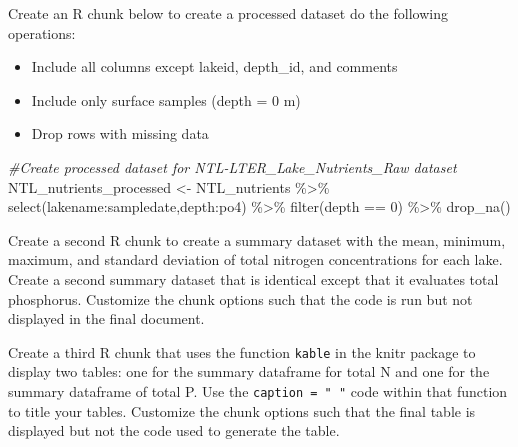 \documentclass[
]{article}
\newenvironment{Shaded}{\begin{snugshade}}{\end{snugshade}}
\newcommand{\CommentTok}[1]{\textcolor[rgb]{0.56,0.35,0.01}{\textit{#1}}}
\newcommand{\DecValTok}[1]{\textcolor[rgb]{0.00,0.00,0.81}{#1}}
\newcommand{\FunctionTok}[1]{\textcolor[rgb]{0.00,0.00,0.00}{#1}}
\newcommand{\NormalTok}[1]{#1}
\newcommand{\OtherTok}[1]{\textcolor[rgb]{0.56,0.35,0.01}{#1}}
\newcommand{\SpecialCharTok}[1]{\textcolor[rgb]{0.00,0.00,0.00}{#1}}
\providecommand{\tightlist}{%
  \setlength{\itemsep}{0pt}\setlength{\parskip}{0pt}}
\begin{document}
Create an R chunk below to create a processed dataset do the following
operations:

\begin{itemize}
\tightlist
\item
  Include all columns except lakeid, depth\_id, and comments
\item
  Include only surface samples (depth = 0 m)
\item
  Drop rows with missing data
\end{itemize}

\begin{Shaded}
\begin{Highlighting}[]
\CommentTok{\#Create processed dataset for NTL{-}LTER\_Lake\_Nutrients\_Raw dataset}
\NormalTok{NTL\_nutrients\_processed }\OtherTok{\textless{}{-}}\NormalTok{ NTL\_nutrients }\SpecialCharTok{\%\textgreater{}\%}
                            \FunctionTok{select}\NormalTok{(lakename}\SpecialCharTok{:}\NormalTok{sampledate,depth}\SpecialCharTok{:}\NormalTok{po4) }\SpecialCharTok{\%\textgreater{}\%}
                            \FunctionTok{filter}\NormalTok{(depth }\SpecialCharTok{==} \DecValTok{0}\NormalTok{) }\SpecialCharTok{\%\textgreater{}\%} 
                            \FunctionTok{drop\_na}\NormalTok{()}
\end{Highlighting}
\end{Shaded}

Create a second R chunk to create a summary dataset with the mean,
minimum, maximum, and standard deviation of total nitrogen
concentrations for each lake. Create a second summary dataset that is
identical except that it evaluates total phosphorus. Customize the chunk
options such that the code is run but not displayed in the final
document.

Create a third R chunk that uses the function \texttt{kable} in the
knitr package to display two tables: one for the summary dataframe for
total N and one for the summary dataframe of total P. Use the
\texttt{caption\ =\ "\ "} code within that function to title your
tables. Customize the chunk options such that the final table is
displayed but not the code used to generate the table.
\end{document}
